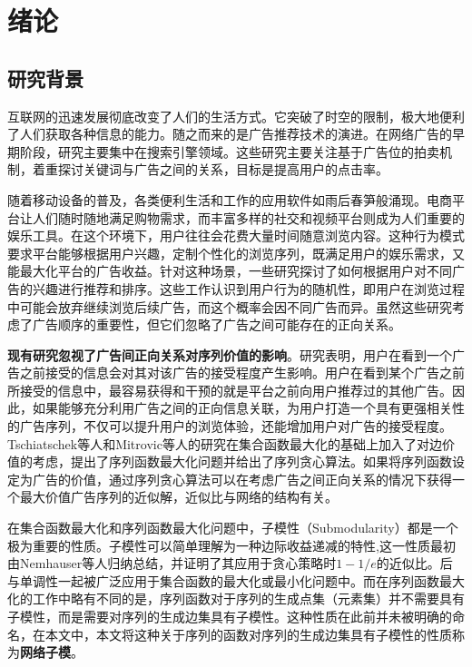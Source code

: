 \chapter{绪论}

\section{研究背景}
互联网的迅速发展彻底改变了人们的生活方式。它突破了时空的限制，极大地便利了人们获取各种信息的能力。随之而来的是广告推荐技术的演进。在网络广告的早期阶段，研究主要集中在搜索引擎领域。这些研究主要关注基于广告位的拍卖机制，着重探讨关键词与广告之间的关系，目标是提高用户的点击率\cite{edelman2007internet,attenberg2009modeling}。

随着移动设备的普及，各类便利生活和工作的应用软件如雨后春笋般涌现。电商平台让人们随时随地满足购物需求，而丰富多样的社交和视频平台则成为人们重要的娱乐工具。在这个环境下，用户往往会花费大量时间随意浏览内容。这种行为模式要求平台能够根据用户兴趣，定制个性化的浏览序列，既满足用户的娱乐需求，又能最大化平台的广告收益。针对这种场景，一些研究\cite{kempe2008cascade,craswell2008experimental,tang2017robust}探讨了如何根据用户对不同广告的兴趣进行推荐和排序。这些工作认识到用户行为的随机性，即用户在浏览过程中可能会放弃继续浏览后续广告，而这个概率会因不同广告而异。虽然这些研究考虑了广告顺序的重要性，但它们忽略了广告之间可能存在的正向关系。

\textbf{现有研究忽视了广告间正向关系对序列价值的影响}。研究表明，用户在看到一个广告之前接受的信息会对其对该广告的接受程度产生影响\cite{loda2005sequence}。用户在看到某个广告之前所接受的信息中，最容易获得和干预的就是平台之前向用户推荐过的其他广告。因此，如果能够充分利用广告之间的正向信息关联，为用户打造一个具有更强相关性的广告序列，不仅可以提升用户的浏览体验，还能增加用户对广告的接受程度。Tschiatschek等人\cite{tschiatschek2017selecting}和Mitrovic等人\cite{mitrovic2018submodularity}的研究在集合函数最大化的基础上加入了对边价值的考虑，提出了序列函数最大化问题并给出了序列贪心算法。如果将序列函数设定为广告的价值，通过序列贪心算法可以在考虑广告之间正向关系的情况下获得一个最大价值广告序列的近似解，近似比与网络的结构有关。

在集合函数最大化和序列函数最大化问题中，子模性（Submodularity）都是一个极为重要的性质。子模性可以简单理解为一种边际收益递减的特性,这一性质最初由Nemhauser\cite{nemhauser1978analysis}等人归纳总结，并证明了其应用于贪心策略时$1-1/e$的近似比。后与单调性一起被广泛应用于集合函数的最大化或最小化问题中\cite{nemhauser1978best,khuller1999budgeted}。而在序列函数最大化的工作中\cite{tschiatschek2017selecting,mitrovic2018submodularity}略有不同的是，序列函数对于序列的生成点集（元素集）并不需要具有子模性，而是需要对序列的生成边集具有子模性。这种性质在此前并未被明确的命名，在本文中，本文将这种关于序列的函数对序列的生成边集具有子模性的性质称为\textbf{网络子模}。 

